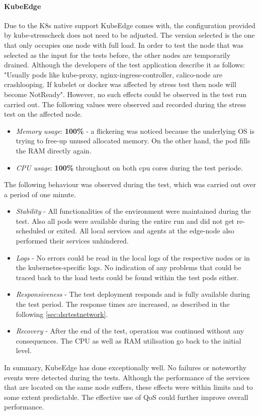 \documentclass[MIC,Master,english]{twbook}%
\begin{document}
\paragraph{KubeEdge} Due to the \ac{K8s} native support KubeEdge comes with, the configuration provided by kube-stresscheck does not need to be adjusted. The version selected is the one that only occupies one node with full load. In order to test the node that was selected as the input for the tests before, the other nodes are temporarily drained. Although the developers of the test application describe it as follows: "Usually pods like kube-proxy, nginx-ingress-controller, calico-node are crashlooping. If kubelet or docker was affected by stress test then node will become NotReady"\cite{kube-stress}. However, no such effects could be observed in the test run carried out. The following values were observed and recorded during the stress test on the affected node. 

\begin{itemize}
    \item \textit{Memory usage}: \textbf{100\%} - a flickering was noticed because the underlying \ac{OS} is trying to free-up unused allocated memory. On the other hand, the pod fills the \ac{RAM} directly again.
    \item \textit{CPU usage}: \textbf{100\%} throughout on both cpu cores during the test periode. 
\end{itemize}
The following behaviour was observed during the test, which was carried out over a period of one minute.

\begin{itemize} 
    \item \textit{Stability} - All functionalities of the environment were maintained during the test. Also all pods were available during the entire run and did not get re-scheduled or exited. All local services and agents at the edge-node also performed their services unhindered.
    \item \textit{Logs} - No errors could be read in the local logs of the respective nodes or in the kubernetes-specific logs. No indication of any problems that could be traced back to the load tests could be found within the test pods either.
    \item \textit{Responsiveness} - The test deployment responds and is fully available during the test period. The response times are increased, as described in the following \autoref{sec:dsrtestnetwork}.
    \item \textit{Recovery} - After the end of the test, operation was continued without any consequences. The CPU as well as RAM utilisation go back to the initial level. 
\end{itemize}
In summary, KubeEdge has done exceptionally well. No failures or noteworthy events were detected during the tests. Although the performance of the services that are located on the same node suffers, these effects were within limits and to some extent predictable. The effective use of \ac{QoS} could further improve overall performance.
\end{document}
